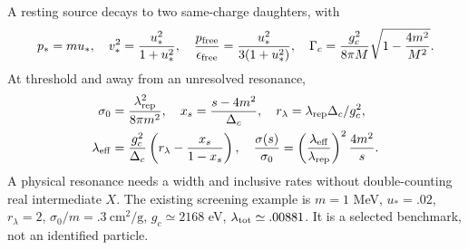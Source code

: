 \documentclass[11pt]{article}
\begin{document}
A resting source decays to two same-charge daughters, with
\begin{equation}
 p_*=mu_*,\quad v_*^2=\frac{u_*^2}{1+u_*^2},\quad
 \frac{p_{\rm free}}{\epsilon_{\rm free}}=\frac{u_*^2}{3(1+u_*^2)},\quad
 \Gamma_c=\frac{g_c^2}{8\pi M}\sqrt{1-\frac{4m^2}{M^2}}.
\end{equation}
At threshold and away from an unresolved resonance,
\begin{align}
 \sigma_0&=\frac{\lambda_{\rm rep}^2}{8\pi m^2},\quad
 x_s=\frac{s-4m^2}{\Delta_c},\quad r_\lambda=\lambda_{\rm rep}\Delta_c/g_c^2,\\
 \lambda_{\rm eff}&=\frac{g_c^2}{\Delta_c}
 \left(r_\lambda-\frac{x_s}{1-x_s}\right),\quad
 \frac{\sigma(s)}{\sigma_0}=\left(\frac{\lambda_{\rm eff}}{\lambda_{\rm rep}}\right)^2
 \frac{4m^2}{s}.
\end{align}
A physical resonance needs a width and inclusive rates without double-counting
real intermediate $X$. The existing screening example is $m=1$ MeV,
$u_*=.02$, $r_\lambda=2$, $\sigma_0/m=.3\ \mathrm{cm^2/g}$,
$g_c\simeq2168$ eV, $\lambda_{\rm tot}\simeq.00881$.
It is a selected benchmark, not an identified particle.
\end{document}
